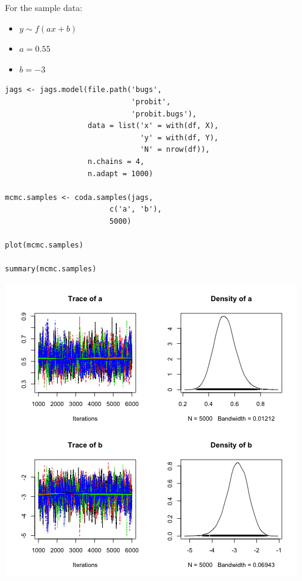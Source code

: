 \documentclass{beamer}
\begin{document}
\begin{frame}
  For the sample data:
  \begin{itemize}
    \item{$y \sim f(ax + b)$}
    \item{$a = 0.55$}
    \item{$b = -3$}
  \end{itemize}
\end{frame}

\begin{frame}[fragile]
  \begin{verbatim}
jags <- jags.model(file.path('bugs',
                             'probit',
                             'probit.bugs'),
                   data = list('x' = with(df, X),
                               'y' = with(df, Y),
                               'N' = nrow(df)),
                   n.chains = 4,
                   n.adapt = 1000)
 
mcmc.samples <- coda.samples(jags,
                        c('a', 'b'),
                        5000)

plot(mcmc.samples)

summary(mcmc.samples)
  \end{verbatim}
\end{frame}

\begin{frame}[fragile]
  \begin{center}
    \includegraphics[scale = 0.4]{../graphs/probit/plot1.png}
  \end{center}
\end{frame}
\end{document}
